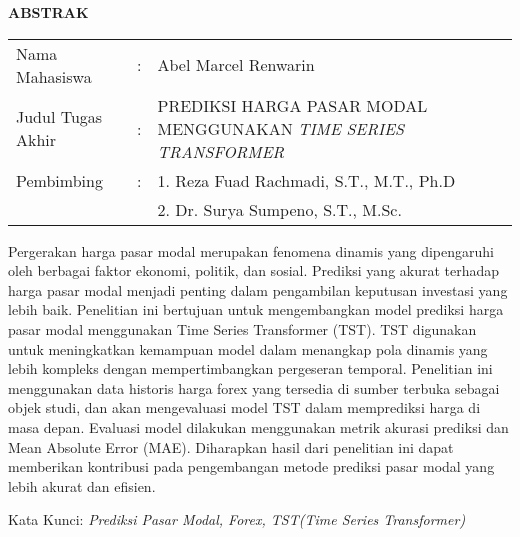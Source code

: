 \begin{center}
  \large\textbf{ABSTRAK}
\end{center}


\vspace{2ex}

\begingroup
\setlength{\tabcolsep}{0pt}

\noindent
\begin{tabularx}{\textwidth}{l >{\centering}m{2em} X}
  Nama Mahasiswa    & : & {Abel Marcel Renwarin}         \\

  Judul Tugas Akhir & : & {PREDIKSI HARGA PASAR MODAL MENGGUNAKAN \textit{TIME SERIES TRANSFORMER}}      \\

  Pembimbing        & : & 1. {Reza Fuad Rachmadi, S.T., M.T., Ph.D}   \\
                    &   & 2. {Dr. Surya Sumpeno, S.T., M.Sc.} \\
\end{tabularx}
\endgroup

Pergerakan harga pasar modal merupakan fenomena dinamis yang dipengaruhi oleh berbagai faktor ekonomi, politik, dan sosial. Prediksi yang akurat terhadap harga pasar modal menjadi penting dalam pengambilan keputusan investasi yang lebih baik. Penelitian ini bertujuan untuk mengembangkan model prediksi harga pasar modal menggunakan Time Series Transformer (TST). TST digunakan untuk meningkatkan kemampuan model dalam menangkap pola dinamis yang lebih kompleks dengan mempertimbangkan pergeseran temporal. Penelitian ini menggunakan data historis harga forex yang tersedia di sumber terbuka sebagai objek studi, dan akan mengevaluasi model TST dalam memprediksi harga di masa depan. Evaluasi model dilakukan menggunakan metrik akurasi prediksi dan Mean Absolute Error (MAE). Diharapkan hasil dari penelitian ini dapat memberikan kontribusi pada pengembangan metode prediksi pasar modal yang lebih akurat dan efisien.

Kata Kunci: \emph{Prediksi Pasar Modal, Forex, TST(Time Series Transformer)}
